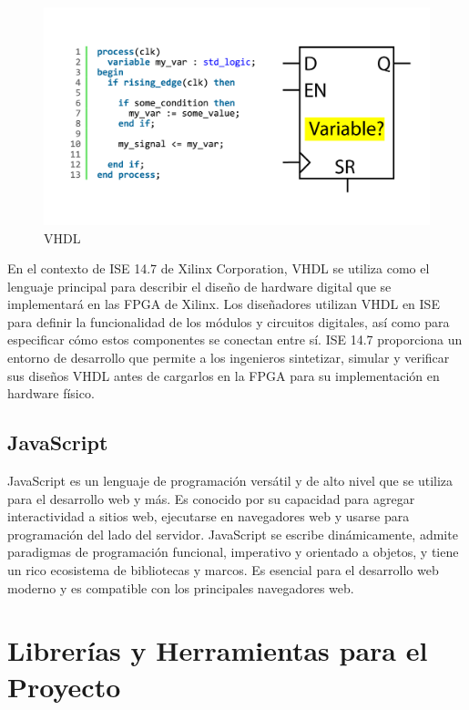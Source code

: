 \documentclass[journal]{IEEEtran}
\begin{document}
\begin{figure}[H]
    \begin{center}
        \includegraphics[scale=0.12]{images/variables-as-registers.png}
        \caption{VHDL}
        \label{Amplificador Operacional}
    \end{center}
\end{figure}


En el contexto de ISE 14.7 de Xilinx Corporation, VHDL se utiliza como el lenguaje principal para describir el diseño de hardware digital que se implementará en las FPGA de Xilinx. Los diseñadores utilizan VHDL en ISE para definir la funcionalidad de los módulos y circuitos digitales, así como para especificar cómo estos componentes se conectan entre sí. ISE 14.7 proporciona un entorno de desarrollo que permite a los ingenieros sintetizar, simular y verificar sus diseños VHDL antes de cargarlos en la FPGA para su implementación en hardware físico.


\subsection{JavaScript}

JavaScript es un lenguaje de programación versátil y de alto nivel que se utiliza para el desarrollo web y más. Es conocido por su capacidad para agregar interactividad a sitios web, ejecutarse en navegadores web y usarse para programación del lado del servidor. JavaScript se escribe dinámicamente, admite paradigmas de programación funcional, imperativo y orientado a objetos, y tiene un rico ecosistema de bibliotecas y marcos. Es esencial para el desarrollo web moderno y es compatible con los principales navegadores web.
\\

\section*{Librerías y Herramientas para el Proyecto}
\end{document}
